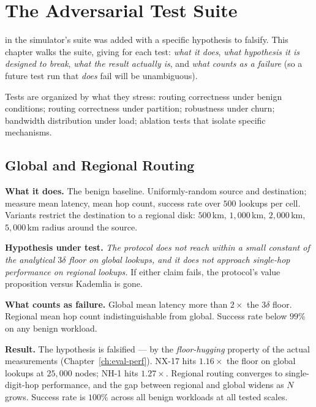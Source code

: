 \documentclass[twoside,nobib]{tufte-book}
\begin{document}
\chapter{The Adversarial Test Suite}
\label{ch:sim-tests}

 in the simulator's suite was added with a
specific hypothesis to falsify. This chapter walks the suite,
giving for each test: \emph{what it does}, \emph{what hypothesis
it is designed to break}, \emph{what the result actually is}, and
\emph{what counts as a failure} (so a future test run that
\emph{does} fail will be unambiguous).

Tests are organized by what they stress: routing correctness
under benign conditions; routing correctness under partition;
robustness under churn; bandwidth distribution under load;
ablation tests that isolate specific mechanisms.

\section{Global and Regional Routing}

\textbf{What it does.} The benign baseline. Uniformly-random
source and destination; measure mean latency, mean hop count,
success rate over $500$ lookups per cell. Variants restrict the
destination to a regional disk: $500$\,km, $1{,}000$\,km,
$2{,}000$\,km, $5{,}000$\,km radius around the source.

\textbf{Hypothesis under test.} \emph{The protocol does not
reach within a small constant of the analytical $3\delta$
floor on global lookups, and it does not approach single-hop
performance on regional lookups.} If either claim fails, the
protocol's value proposition versus Kademlia is gone.

\textbf{What counts as failure.} Global mean latency more than
$2\times$ the $3\delta$ floor. Regional mean hop count
indistinguishable from global. Success rate below $99\%$ on any
benign workload.

\textbf{Result.} The hypothesis is falsified --- by the
\emph{floor-hugging} property of the actual measurements
(Chapter~\ref{ch:eval-perf}). NX-17 hits $1.16\times$ the floor on
global lookups at $25{,}000$ nodes; NH-1 hits $1.27\times$.
Regional routing converges to single-digit-hop performance, and
the gap between regional and global widens as $N$ grows. Success
rate is $100\%$ across all benign workloads at all tested scales.
\end{document}
